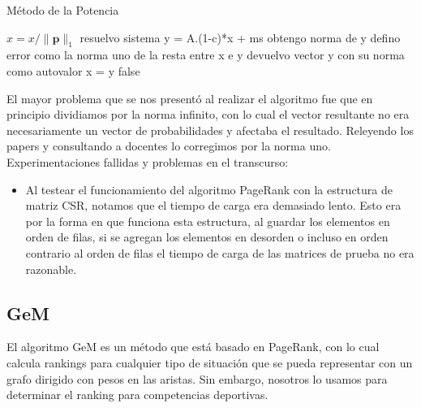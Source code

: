 \begin{algorithm}
\caption{Método de la Potencia}\label{metpot}
\begin{algorithmic}[1]


    \State $x = x/\lVert \mathbf{p} \rVert _{1}$
	    \State resuelvo sistema y = A.(1-c)*x + ms
 	    \State obtengo norma de y
 	    \State 	defino error como la norma uno de la resta entre x e y
      	\State devuelvo vector y con su norma como autovalor
      \Else
        \State x = y
      \EndIf
    \EndWhile
    \Return false
  \EndFunction

\end{algorithmic}
\end{algorithm}


El mayor problema que se nos presentó al realizar el algoritmo fue que en principio dividiamos por la norma infinito, con lo cual el vector resultante no era necesariamente un vector de probabilidades y afectaba el resultado. Releyendo los papers y consultando a docentes lo corregimos por la norma uno.\\


Experimentaciones fallidas y problemas en el transcurso:
\begin{itemize}
\item Al testear el funcionamiento del algoritmo PageRank con la estructura de matriz CSR, notamos que el tiempo de carga era demasiado lento. Esto era por la forma en que funciona esta estructura, al guardar los elementos en orden de filas, si se agregan los elementos en desorden o incluso en orden contrario al orden de filas el tiempo de carga de las matrices de prueba no era razonable.
\end{itemize}


\subsection{GeM}

El algoritmo GeM es un método que está basado en PageRank, con lo cual calcula rankings para cualquier tipo de situación que se pueda representar con un grafo dirigido con pesos en las aristas. Sin embargo, nosotros lo usamos para determinar el ranking para competencias deportivas.\\

